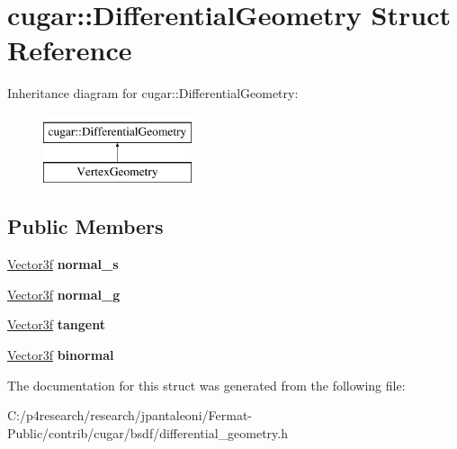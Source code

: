 \hypertarget{structcugar_1_1_differential_geometry}{}\section{cugar\+:\+:Differential\+Geometry Struct Reference}
\label{structcugar_1_1_differential_geometry}
Inheritance diagram for cugar\+:\+:Differential\+Geometry\+:\begin{figure}[H]
\begin{center}
\leavevmode
\includegraphics[height=2.000000cm]{structcugar_1_1_differential_geometry}
\end{center}
\end{figure}
\subsection*{Public Members}
\begin{DoxyCompactItemize}
\item 
\mbox{\label{structcugar_1_1_differential_geometry_aabf2543aae8db745fd6d8f970d026844}} 
\hyperlink{structcugar_1_1_vector}{Vector3f} {\bfseries normal\+\_\+s}
\item 
\mbox{\label{structcugar_1_1_differential_geometry_ae3cea3b6c0a013bfc6afcd577dfbaa16}} 
\hyperlink{structcugar_1_1_vector}{Vector3f} {\bfseries normal\+\_\+g}
\item 
\mbox{\label{structcugar_1_1_differential_geometry_a453e0b8ba0dd380dfff68935e36f4d07}} 
\hyperlink{structcugar_1_1_vector}{Vector3f} {\bfseries tangent}
\item 
\mbox{\label{structcugar_1_1_differential_geometry_a4f0f88fac0d7463008e23af95ca846af}} 
\hyperlink{structcugar_1_1_vector}{Vector3f} {\bfseries binormal}
\end{DoxyCompactItemize}


The documentation for this struct was generated from the following file\+:\begin{DoxyCompactItemize}
\item 
C\+:/p4research/research/jpantaleoni/\+Fermat-\/\+Public/contrib/cugar/bsdf/differential\+\_\+geometry.\+h\end{DoxyCompactItemize}
